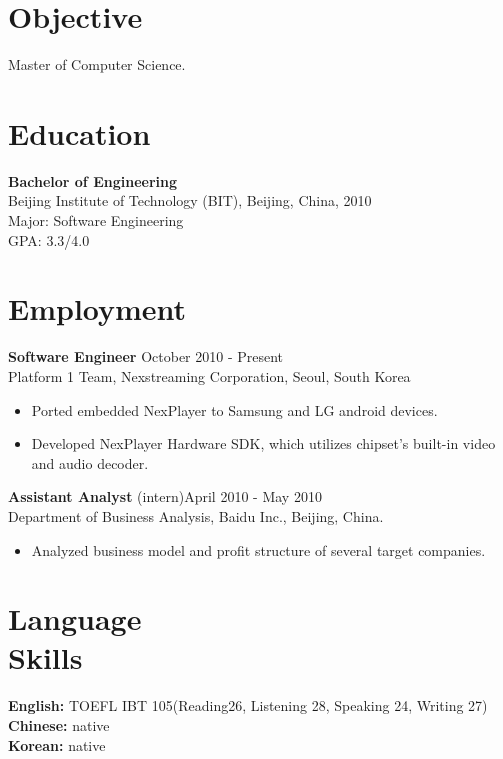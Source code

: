 \documentclass[margin]{res}
\begin{document}
\begin{resume}
 
\section{Objective}  Master of Computer Science. 

\section{Education} {\bf Bachelor of Engineering  } \\
                Beijing Institute of Technology (BIT), Beijing, China,  2010 	\\
                Major: Software Engineering \\
                GPA: 3.3/4.0
 
\section{Employment} 
				{ \bf Software Engineer} \hfill October 2010 - Present \\
                Platform 1 Team, Nexstreaming Corporation, Seoul, South Korea               
                 \begin{itemize}  \itemsep -2pt %
                 \item Ported embedded NexPlayer to Samsung and LG android devices.
                \item   Developed NexPlayer Hardware SDK, which utilizes chipset's built-in video and audio decoder.
                \end{itemize}
 
                {\bf Assistant Analyst} (intern)\hfill            April 2010 - May 2010 \\
                Department of Business Analysis, Baidu Inc., Beijing, China. 
                 \begin{itemize}  \itemsep -2pt %
                 \item Analyzed business model and profit structure of several target companies.
                 \end{itemize} 

 \section{Language \\ Skills} 
				{\bf English:} TOEFL IBT 105(Reading26, Listening 28, Speaking 24, Writing 27)\\
				{\bf Chinese:} native \\
				{\bf Korean: } native	\\	 
 

\end{resume}
\end{document}
